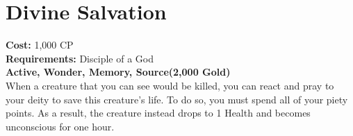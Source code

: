 \section{Divine Salvation}\label{wonder:divineSalvation}
\textbf{Cost:} 1,000 CP\\
\textbf{Requirements:} Disciple of a God\\
\textbf{Active, Wonder, Memory, Source(2,000 Gold)}\\
When a creature that you can see would be killed, you can react and pray to your deity to save this creature's life.
To do so, you must spend all of your piety points.
As a result, the creature instead drops to 1 Health and becomes unconscious for one hour.
\\